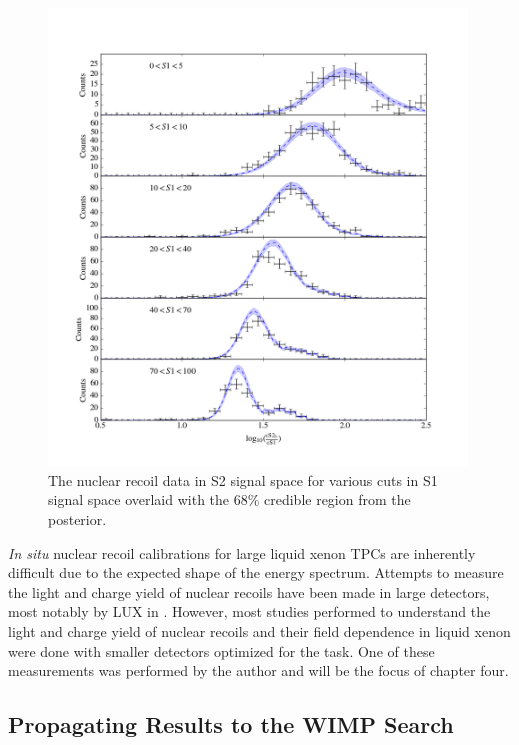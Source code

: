 \begin{figure}[p]
	\centering
	\includegraphics[width=0.99\textwidth]{xe1t_nr_results_s2_slices}
	\caption{The nuclear recoil data in S2 signal space for various cuts in S1 signal space overlaid with the 68\% credible region from the posterior.}
	\label{fig:xe1t_nr_cal_s2_slices}
\end{figure}


\textit{In situ} nuclear recoil calibrations for large liquid xenon TPCs are inherently difficult due to the expected shape of the energy spectrum.  Attempts to measure the light and charge yield of nuclear recoils have been made in large detectors, most notably by LUX in .  However, most studies performed to understand the light and charge yield of nuclear recoils and their field dependence in liquid xenon were done with smaller detectors optimized for the task.  One of these measurements was performed by the author and will be the focus of chapter four.


\subsection{Propagating Results to the WIMP Search}
\label{sec:xe1t_propagating_results}


